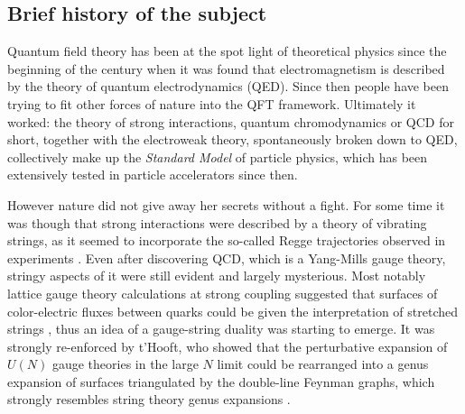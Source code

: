 \subsection{Brief history of the subject}

Quantum field theory has been at the spot light of theoretical physics since the beginning of the century when it was found that electromagnetism is described by the theory of quantum electrodynamics (QED). Since then people have been trying to fit other forces of nature into the QFT framework. 
Ultimately it worked: the theory of strong interactions, quantum chromodynamics or QCD for short, together with the electroweak theory, spontaneously broken down to QED, collectively make up the \emph{Standard Model} of particle physics, which has been extensively tested in particle accelerators since then. 

However nature did not give away her secrets without a fight. 
For some time it was though that strong interactions were described by a theory of vibrating strings, as it seemed to incorporate the so-called Regge trajectories observed in experiments \cite{Veneziano:1968}. 
Even after discovering QCD, which is a Yang-Mills gauge theory, stringy aspects of it were still evident and largely mysterious. 
Most notably lattice gauge theory calculations at strong coupling suggested that surfaces of color-electric fluxes between quarks could be given the interpretation of stretched strings \cite{Wilson:1974}, thus an idea of a gauge-string duality was starting to emerge. 
It was strongly re-enforced by t'Hooft, who showed that the perturbative expansion of $U(N)$ gauge theories in the large $N$ limit could be rearranged into a genus expansion of surfaces triangulated by the double-line Feynman graphs, which strongly resembles string theory genus expansions \cite{THooft:1974}.

\vspace{20pt}
\newlength\yearposx
{}
\vspace{20pt}

